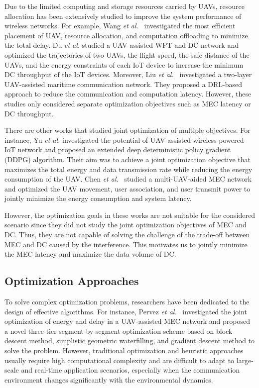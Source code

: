 \par Due to the limited computing and storage resources carried by UAVs, resource allocation has been extensively studied to improve the system performance of wireless networks. For example, Wang \textit{et al.}~\cite{wang2023a} investigated the most efficient placement of UAV, resource allocation, and computation offloading to minimize the total delay. Du \textit{et al.} \cite{Du2024} studied a UAV-assisted WPT and DC network and optimized the trajectories of two UAVs, the flight speed, the safe distance of the UAVs, and the energy constraints of each IoT device to increase the minimum DC throughput of the IoT devices. Moreover, Liu \textit{et al.}~\cite{Liu2022} investigated a two-layer UAV-assisted maritime communication network. They proposed a DRL-based approach to reduce the communication and computation latency. However, these studies only considered separate optimization objectives such as MEC latency or DC throughput. 

\par There are other works that studied joint optimization of multiple objectives. For instance, Yu \textit{et al.} \cite{Yu2021} investigated the potential of UAV-assisted wireless-powered IoT network and proposed an extended deep deterministic policy gradient (DDPG) algorithm. Their aim was to achieve a joint optimization objective that maximizes the total energy and data transmission rate while reducing the energy consumption of the UAV. Chen \textit{et al.}~\cite{Chen2023} studied a multi-UAV-aided MEC network and optimized the UAV movement, user association, and user transmit power to jointly minimize the energy consumption and system latency.

\par However, the optimization goals in these works are not suitable for the considered scenario since they did not study the joint optimization objectives of MEC and DC. Thus, they are not capable of solving the challenge of the trade-off between MEC and DC caused by the interference. This motivates us to jointly minimize the MEC latency and maximize the data volume of DC.


\subsection{Optimization Approaches}

\par To solve complex optimization problems, researchers have been dedicated to the design of effective algorithms. For instance, Pervez \textit{et al.}~\cite{Pervez2024} investigated the joint optimization of energy and delay in a UAV-assisted MEC network and proposed a novel three-tier segment-by-segment optimization scheme based on block descent method, simplistic geometric waterfilling, and gradient descent method to solve the problem. However, traditional optimization and heuristic approaches usually require high computational complexity and are difficult to adapt to large-scale and real-time application scenarios, especially when the communication environment changes significantly with the environmental dynamics.

